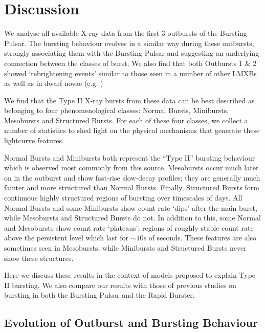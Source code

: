 \section{Discussion}

\par We analyse all available X-ray data from the first 3 outbursts of the Bursting Pulsar.  The bursting behaviour evolves in a similar way during these outbursts, strongly associating them with the Bursting Pulsar and suggesting an underlying connection between the classes of burst.  We also find that both Outbursts 1 \& 2 showed `rebrightening events' similar to those seen in a number of other LMXBs as well as in dwarf novae (e.g. \citealp{Wijnands_1808,Patruno_Reflares2})
\par We find that the Type II X-ray bursts from these data can be best described as belonging to four phenomenological classes: Normal Bursts, Minibursts, Mesobursts and Structured Bursts.  For each of these four classes, we collect a number of statistics to shed light on the physical mechanisms that generate these lightcurve features.
\par Normal Bursts and Minibursts both represent the ``Type II'' bursting behaviour which is observed most commonly from this source.   Mesobursts occur much later on in the outburst and show fast-rise slow-decay profiles; they are generally much fainter and more structured than Normal Bursts.  Finally, Structured Bursts form continuous highly structured regions of bursting over timescales of days.  All Normal Bursts and some Minibursts show count rate `dips' after the main burst, while Mesobursts and Structured Bursts do not.  In addition to this, some Normal and Mesobursts show count rate `plateaus'; regions of roughly stable count rate above the persistent level which last for $\sim10$s of seconds.  These features are also sometimes seen in Mesobursts, while Minibursts and Structured Bursts never show these structures.
\par Here we discuss these results in the context of models proposed to explain Type II bursting.  We also compare our results with those of previous studies on bursting in both the Bursting Pulsar and the Rapid Burster.

\subsection{Evolution of Outburst and Bursting Behaviour}

